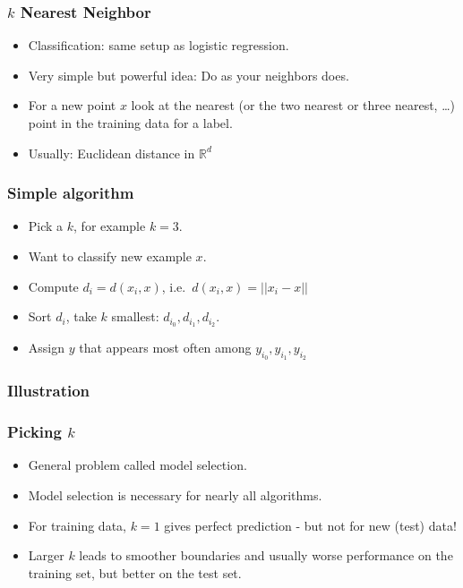 \begin{frame}
    \frametitle{$k$ Nearest Neighbor}
    \begin{itemize}
        \item Classification: same setup as logistic regression.
        \item Very simple but powerful idea: Do as your neighbors does.
        \item For a new point $x$ look at the nearest (or the two nearest or three nearest, \ldots)
            point in the training data for a label.
        \item Usually: Euclidean distance in $\mathbb{R}^d$
    \end{itemize}
\end{frame}

\begin{frame}
    \frametitle{Simple algorithm}
    \begin{itemize}
        \item Pick a $k$, for example $k=3$.
        \item Want to classify new example $x$.
        \item Compute $d_i = d(x_i, x)$, i.e.\, $d(x_i, x) = ||x_i - x||$
        \item Sort $d_i$, take $k$ smallest: $d_{i_0}, d_{i_1}, d_{i_2}$.
        \item Assign $y$ that appears most often among $y_{i_0}, y_{i_1}, y_{i_2}$
    \end{itemize}
\end{frame}

\begin{frame}
    \frametitle{Illustration}
\end{frame}

\begin{frame}
    \frametitle{Picking $k$}
    \begin{itemize}
        \item General problem called model selection.
        \item Model selection is necessary for nearly all algorithms.
        \item For training data, $k=1$ gives perfect prediction - but not for new (test) data!
        \item Larger $k$ leads to smoother boundaries and usually worse performance on the training set,
            but better on the test set.
    \end{itemize}
\end{frame}


